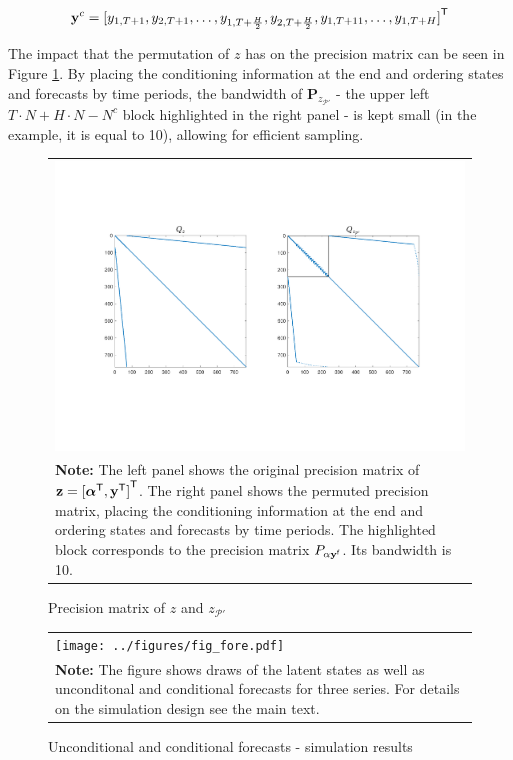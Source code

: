 \documentclass[notitlepage,a4paper,12pt]{article}
\newcommand{\transpose}[1]{{#1}^{\sf{T}}}
\begin{document}
$$\mathbf{y}^c = \transpose{[y_{1,T+1}, y_{2,T+1}, \dots, y_{1,T+\frac{H}{2}}, y_{2,T+\frac{H}{2}}, y_{1,T+11}, \dots, y_{1,T+H}]}
$$

The impact that the permutation of $z$ has on the precision matrix can be seen in Figure \ref{fig_Pperm}. By placing the conditioning information at the end and ordering states and forecasts by time periods, the bandwidth of $\mathbf{P}_{z_{\mathcal{P}'}}$ - the upper left $T\!\cdot\!N + H\!\cdot\!N - N^c$ block highlighted in the right panel - is kept small (in the example, it is equal to 10), allowing for efficient sampling. 


\begin{figure}[htbp] \centering
    \caption{Precision matrix of $z$ and $z_{\mathcal{P}'}$\label{fig_Pperm}}
    \footnotesize
    \begin{tabular}{p{16cm}}
    \includegraphics*[scale=0.5,clip,trim=10 60 10 60]{../figures/fig_P_perm.pdf} \\
    \footnotesize \textbf{Note:} The left panel shows the original precision matrix of $\mathbf{z} = \transpose{[\transpose{\boldsymbol{\alpha}}, \transpose{\mathbf{y}}]}$. The right panel shows the permuted precision matrix, placing the conditioning information at the end and ordering states and forecasts by time periods. The highlighted block corresponds to the precision matrix $P_{\alpha\mathbf{y}^{\sf{f}}}$. Its bandwidth is 10. 
    \end{tabular}
    \newline
    \normalsize
\end{figure}

\begin{figure}[htbp] \centering
    \caption{Unconditional and conditional forecasts - simulation results\label{fig_simfore}}
    \footnotesize
    \begin{tabular}{p{16cm}}
    \texttt{[image: ../figures/fig\_fore.pdf]} \\
    \footnotesize \textbf{Note:} The figure shows draws of the latent states as well as unconditonal and conditional forecasts for three series. For details on the simulation design see the main text.
    \end{tabular}
    \newline
    \normalsize
\end{figure}
\end{document}
